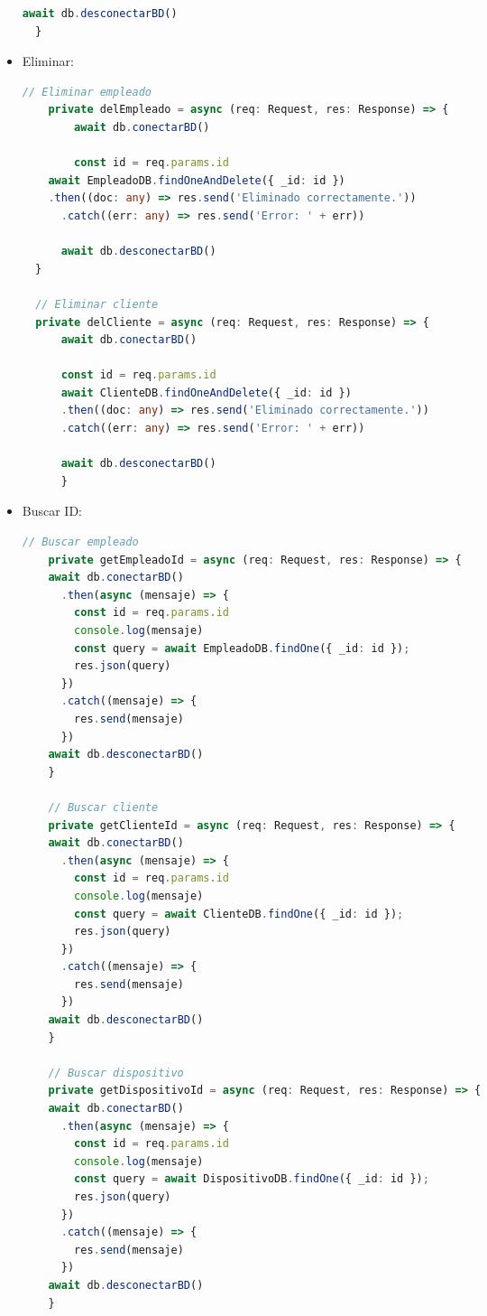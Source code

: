 \documentclass[a4paper]{article} %
\begin{document}
\begin{itemize}
\begin{lstlisting}[language=Typescript]
    await db.desconectarBD()
  }
\end{lstlisting}\clearpage
	\item Eliminar:
\begin{lstlisting}[language=Typescript]
	// Eliminar empleado
	private delEmpleado = async (req: Request, res: Response) => {
		await db.conectarBD()
		
		const id = req.params.id
    await EmpleadoDB.findOneAndDelete({ _id: id })
	.then((doc: any) => res.send('Eliminado correctamente.'))
      .catch((err: any) => res.send('Error: ' + err))
	  
	  await db.desconectarBD()
  }
  
  // Eliminar cliente
  private delCliente = async (req: Request, res: Response) => {
	  await db.conectarBD()

	  const id = req.params.id
	  await ClienteDB.findOneAndDelete({ _id: id })
      .then((doc: any) => res.send('Eliminado correctamente.'))
      .catch((err: any) => res.send('Error: ' + err))
	  
	  await db.desconectarBD()
	  }
\end{lstlisting}\clearpage
		\item Buscar ID:
\begin{lstlisting}[language=Typescript]
	// Buscar empleado
	private getEmpleadoId = async (req: Request, res: Response) => {
	await db.conectarBD()
	  .then(async (mensaje) => {
		const id = req.params.id
		console.log(mensaje)
		const query = await EmpleadoDB.findOne({ _id: id });
		res.json(query)
	  })
	  .catch((mensaje) => {
		res.send(mensaje)
	  })
	await db.desconectarBD()
	}
	
	// Buscar cliente
	private getClienteId = async (req: Request, res: Response) => {
	await db.conectarBD()
	  .then(async (mensaje) => {
		const id = req.params.id
		console.log(mensaje)
		const query = await ClienteDB.findOne({ _id: id });
		res.json(query)
	  })
	  .catch((mensaje) => {
		res.send(mensaje)
	  })
	await db.desconectarBD()
	}
	
	// Buscar dispositivo
	private getDispositivoId = async (req: Request, res: Response) => {
	await db.conectarBD()
	  .then(async (mensaje) => {
		const id = req.params.id
		console.log(mensaje)
		const query = await DispositivoDB.findOne({ _id: id });
		res.json(query)
	  })
	  .catch((mensaje) => {
		res.send(mensaje)
	  })
	await db.desconectarBD()
	}
	

\end{lstlisting}
\end{itemize}
\end{document}
